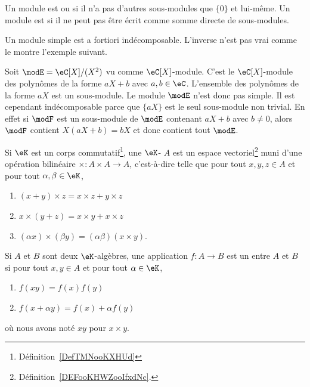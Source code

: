 \begin{definition}
	Un module est  ou  si il n'a pas d'autres sous-modules que \( \{ 0 \}\) et lui-même. Un module est  si il ne peut pas être écrit comme somme directe de sous-modules.
\end{definition}

Un module simple est a fortiori indécomposable. L'inverse n'est pas vrai comme le montre l'exemple suivant.

\begin{example}
	Soit \( \modE=\eC[X]/(X^2)\) vu comme \( \eC[X]\)-module. C'est le \( \eC[X]\)-module des polynômes de la forme \( aX+b\) avec \( a,b\in \eC\). L'ensemble des polynômes de la forme \( aX\) est un sous-module. Le module \( \modE\) n'est donc pas simple. Il est cependant indécomposable parce que \( \{ aX \}\) est le seul sous-module non trivial. En effet si \( \modF\) est un sous-module de \( \modE\) contenant \( aX+b\) avec \( b\neq 0\), alors \( \modF\) contient \( X(aX+b)=bX\) et donc contient tout \( \modE\).
\end{example}

\begin{definition}   \label{DefAEbnJqI}
	Si \( \eK\) est un corps commutatif\footnote{Définition~\ref{DefTMNooKXHUd}}, une \( \eK\)- \( A\) est un espace vectoriel\footnote{Définition~\ref{DEFooKHWZooIfxdNc}.} muni d'une opération bilinéaire \( \times\colon A\times A\to A\), c'est-à-dire telle que pour tout \( x,y,z\in A\) et pour tout \( \alpha,\beta\in\eK\),
	\begin{enumerate}
		\item
		      \( (x+y)\times z=x\times z+y\times z\)
		\item
		      \( x\times (y+z)=x\times y+x\times z\)
		\item
		      \( (\alpha x)\times (\beta y)=(\alpha\beta)(x\times y)\).
	\end{enumerate}
	Si \( A\) et \( B\) sont deux \( \eK\)-algèbres, une application \( f\colon A\to B\) est un  entre \( A\) et \( B\) si pour tout \( x,y\in A\) et pour tout \( \alpha\in \eK\),
	\begin{enumerate}
		\item
		      \( f(xy)=f(x)f(y)\)
		\item
		      \( f(x+\alpha y)=f(x)+\alpha f(y)\)
	\end{enumerate}
	où nous avons noté \( xy\) pour \( x\times y\).
\end{definition}

